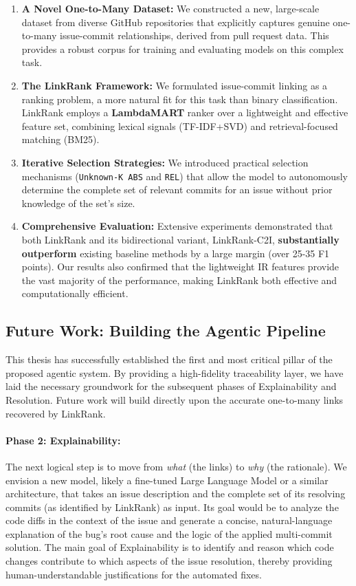 \begin{enumerate}
    \item \textbf{A Novel One-to-Many Dataset:} We constructed a new, large-scale dataset from diverse GitHub repositories that explicitly captures genuine one-to-many issue-commit relationships, derived from pull request data. This provides a robust corpus for training and evaluating models on this complex task.

    \item \textbf{The LinkRank Framework:} We formulated issue-commit linking as a ranking problem, a more natural fit for this task than binary classification. LinkRank employs a \textbf{LambdaMART} ranker over a lightweight and effective feature set, combining lexical signals (TF-IDF+SVD) and retrieval-focused matching (BM25).

    \item \textbf{Iterative Selection Strategies:} We introduced practical selection mechanisms (\texttt{Unknown-K ABS} and \texttt{REL}) that allow the model to autonomously determine the complete set of relevant commits for an issue without prior knowledge of the set's size.

    \item \textbf{Comprehensive Evaluation:} Extensive experiments demonstrated that both LinkRank and its bidirectional variant, LinkRank-C2I, \textbf{substantially outperform} existing baseline methods by a large margin (over 25-35 F1 points). Our results also confirmed that the lightweight IR features provide the vast majority of the performance, making LinkRank both effective and computationally efficient.
\end{enumerate}

\subsection*{Future Work: Building the Agentic Pipeline}

This thesis has successfully established the first and most critical pillar of the proposed agentic system. By providing a high-fidelity traceability layer, we have laid the necessary groundwork for the subsequent phases of Explainability and Resolution. Future work will build directly upon the accurate one-to-many links recovered by LinkRank.

    \paragraph{Phase 2: Explainability:} The next logical step is to move from \textit{what} (the links) to \textit{why} (the rationale). We envision a new model, likely a fine-tuned Large Language Model or a similar architecture, that takes an issue description and the complete set of its resolving commits (as identified by LinkRank) as input. Its goal would be to analyze the code diffs in the context of the issue and generate a concise, natural-language explanation of the bug's root cause and the logic of the applied multi-commit solution. The main goal of Explainability is to identify and reason which code changes contribute to which aspects of the issue resolution, thereby providing human-understandable justifications for the automated fixes.

